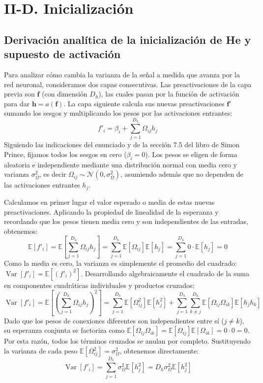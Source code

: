 \documentclass[10pt,a4paper]{article}
\begin{document}
\clearpage
{\setlength{\abovedisplayskip}{1.5pt}\setlength{\belowdisplayskip}{1.5pt}\setlength{\intextsep}{1pt}\setlength{\abovecaptionskip}{1pt}\setlength{\belowcaptionskip}{1pt}
\section*{II-D. Inicialización}

\subsection*{Derivación analítica de la inicialización de He y supuesto de activación}

Para analizar cómo cambia la varianza de la señal a medida que avanza por la red neuronal, consideramos dos capas consecutivas. Las preactivaciones de la capa previa son $\mathbf{f}$ (con dimensión $D_h$), las cuales pasan por la función de activación para dar $\mathbf{h} = a(\mathbf{f})$. La capa siguiente calcula sus nuevas preactivaciones $\mathbf{f}'$ sumando los sesgos y multiplicando los pesos por las activaciones entrantes:
\[
f'_i = \beta_i + \sum_{j=1}^{D_h} \Omega_{ij} h_j
\]
Siguiendo las indicaciones del enunciado y de la sección 7.5 del libro de Simon Prince, fijamos todos los sesgos en cero ($\beta_i = 0$). Los pesos se eligen de forma aleatoria e independiente mediante una distribución normal con media cero y varianza $\sigma_\Omega^2$, es decir $\Omega_{ij} \sim \mathcal{N}(0, \sigma_\Omega^2)$, asumiendo además que no dependen de las activaciones entrantes $h_j$.

Calculamos en primer lugar el valor esperado o media de estas nuevas preactivaciones. Aplicando la propiedad de linealidad de la esperanza y recordando que los pesos tienen media cero y son independientes de las entradas, obtenemos:
\[
\mathbb{E}[f'_i] = \mathbb{E}\left[\sum_{j=1}^{D_h} \Omega_{ij} h_j\right] = \sum_{j=1}^{D_h} \mathbb{E}[\Omega_{ij}] \mathbb{E}[h_j] = \sum_{j=1}^{D_h} 0 \cdot \mathbb{E}[h_j] = 0
\]
Como la media es cero, la varianza es simplemente el promedio del cuadrado: $\operatorname{Var}[f'_i] = \mathbb{E}[(f'_i)^2]$. Desarrollando algebraicamente el cuadrado de la suma en componentes cuadráticas individuales y productos cruzados:
\[
\operatorname{Var}[f'_i] = \mathbb{E}\left[ \left( \sum_{j=1}^{D_h} \Omega_{ij} h_j \right)^2 \right] = \sum_{j=1}^{D_h} \mathbb{E}[\Omega_{ij}^2] \mathbb{E}[h_j^2] + \sum_{j=1}^{D_h} \sum_{k \neq j}^{D_h} \mathbb{E}[\Omega_{ij} \Omega_{ik}] \mathbb{E}[h_j h_k]
\]
Dado que los pesos de conexiones diferentes son independientes entre sí ($j \neq k$), su esperanza conjunta se factoriza como $\mathbb{E}[\Omega_{ij} \Omega_{ik}] = \mathbb{E}[\Omega_{ij}] \mathbb{E}[\Omega_{ik}] = 0 \cdot 0 = 0$. Por esta razón, todos los términos cruzados se anulan por completo. Sustituyendo la varianza de cada peso $\mathbb{E}[\Omega_{ij}^2] = \sigma_\Omega^2$, obtenemos directamente:
\[
\operatorname{Var}[f'_i] = \sum_{j=1}^{D_h} \sigma_\Omega^2 \mathbb{E}[h_j^2] = D_h \sigma_\Omega^2 \mathbb{E}[h_j^2]
\]

}
\end{document}
